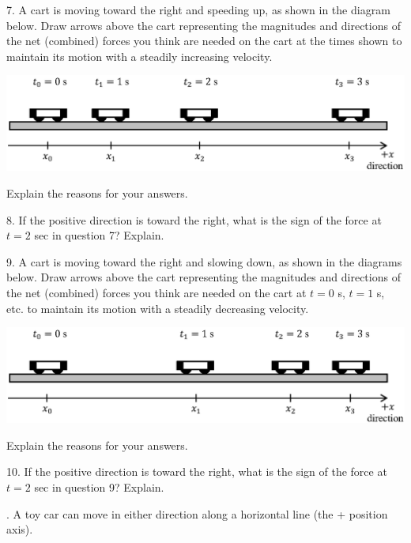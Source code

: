 7. A cart is moving toward the right and speeding up, as shown in the diagram
below. Draw arrows above the cart representing the magnitudes and directions
of the net (combined) forces you think are needed on the cart at the times shown
to maintain its motion with a steadily increasing velocity.

\vspace{0.3cm}
{\par\centering \includegraphics{force2/carts_speeding_hw1.eps} \par}
\vspace{0.3cm}

Explain the reasons for your answers.
\answerspace{20mm}

8. If the positive direction is toward the right, what is the sign of the force
at $t = 2$ sec in question 7? Explain.
\answerspace{20mm}

9. A cart is moving toward the right and slowing down, as shown in the diagrams
below. Draw arrows above the cart representing the magnitudes and directions
of the net (combined) forces you think are needed on the cart at $t = 0$ s, 
$t
= 1$ s, etc. to maintain its motion with a steadily decreasing velocity.

\vspace{0.3cm}
{\par\centering \includegraphics{force2/carts_slowing_hw2.eps} \par}
\vspace{0.3cm}

Explain the reasons for your answers.
\answerspace{25mm}

10. If the positive direction is toward the right, what is the sign of the force
at $t = 2$ sec in question 9? Explain.
\answerspace{25mm}

. A toy car can move in either direction along a horizontal line (the + position
axis).

